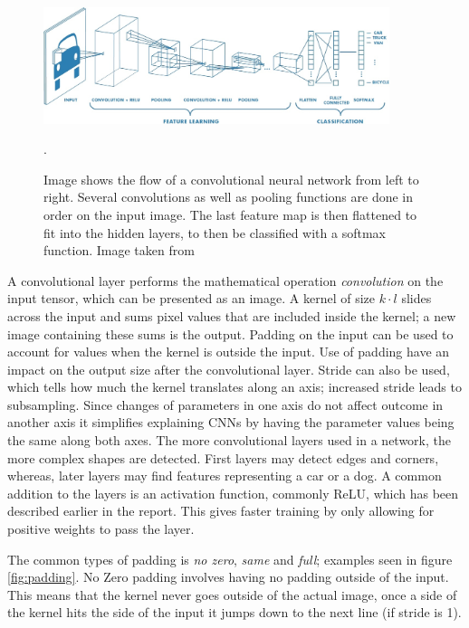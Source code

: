  \begin{figure}[hbtp]
\begin{center}
\includegraphics[width = 0.9\textwidth]{./Images/convNetwork.jpg}
\caption{Image shows the flow of a convolutional neural network from left to right. Several convolutions as well as pooling functions are done in order on the input image. The last feature map is then flattened to fit into the hidden layers, to then be classified with a softmax function. Image taken from \cite{cnnImage}}.
\label{fig:cnn}
\end{center}
\end{figure}
 
 A convolutional layer performs the mathematical operation \textit{convolution} on the input tensor, which can be presented as an image. A kernel of size $k \cdot l$ slides across the input and sums pixel values that are included inside the kernel; a new image containing these sums is the output. Padding on the input can be used to account for values when the kernel is outside the input. Use of padding have an impact on the output size after the convolutional layer. Stride can also be used, which tells how much the kernel translates along an axis;  increased stride leads to subsampling. Since changes of parameters in one axis do not affect outcome in another axis it simplifies explaining CNNs by having the parameter values being the same along both axes. The more convolutional layers used in a network, the more complex shapes are detected. First layers may detect edges and corners, whereas, later layers may find features representing a car or a dog. A common addition to the layers is an activation function, commonly ReLU, which has been described earlier in the report. This gives faster training by only allowing for positive weights to pass the layer.

 The common types of padding is \textit{no zero}, \textit{same} and \textit{full}; examples seen in figure \ref{fig:padding}. No Zero padding involves having no padding outside of the input. This means that the kernel never goes outside of the actual image, once a side of the kernel hits the side of the input it jumps down to the next line (if stride is 1). 
 
